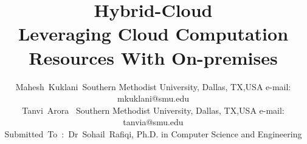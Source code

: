 \documentclass[journal]{hybrid-cloud}
\begin{document}
%
\title{Hybrid-Cloud \\ Leveraging Cloud Computation Resources With On-premises}
%
%
%

\author{Mahesh~Kuklani~Southern Methodist University, Dallas, TX,USA e-mail: mkuklani@smu.edu\\
        Tanvi~Arora~ Southern Methodist University, Dallas, TX,USA e-mail: tanvia@smu.edu\\
        Submitted~To~:~Dr~Sohail~Rafiqi, Ph.D. in Computer Science and Engineering}

% 
%
\end{document}
